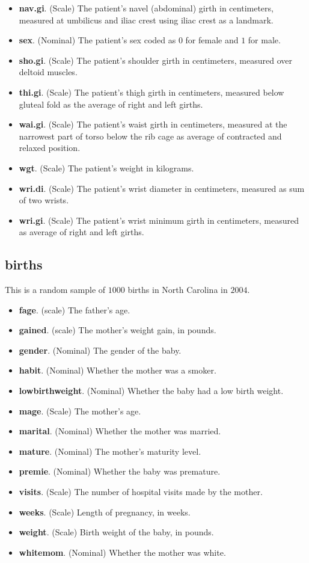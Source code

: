 \begin{itemize}
  \item \textbf{nav.gi}. (Scale) The patient's navel (abdominal) girth in centimeters, measured at umbilicus and iliac crest using iliac crest as a landmark.
  \item \textbf{sex}. (Nominal) The patient's sex coded as $ 0 $ for female and $ 1 $ for male.
  \item \textbf{sho.gi}. (Scale) The patient's shoulder girth in centimeters, measured over deltoid muscles.
  \item \textbf{thi.gi}. (Scale) The patient's thigh girth in centimeters, measured below gluteal fold as the average of right and left girths.
  \item \textbf{wai.gi}. (Scale) The patient's waist girth in centimeters, measured at the narrowest part of torso below the rib cage as average of contracted and relaxed position.  
  \item \textbf{wgt}. (Scale) The patient's weight in kilograms.
  \item \textbf{wri.di}. (Scale) The patient's wrist diameter in centimeters, measured as sum of two wrists.
  \item \textbf{wri.gi}. (Scale) The patient's wrist minimum girth in centimeters, measured as average of right and left girths.  
\end{itemize}

\subsection{births}

This is a random sample of $ 1000 $ births in North Carolina in $ 2004 $.

\begin{itemize}
  \item \textbf{fage}. (scale) The father's age.
  \item \textbf{gained}. (scale) The mother's weight gain, in pounds.
  \item \textbf{gender}. (Nominal) The gender of the baby.
  \item \textbf{habit}. (Nominal) Whether the mother was a smoker.
  \item \textbf{lowbirthweight}. (Nominal) Whether the baby had a low birth weight.
  \item \textbf{mage}. (Scale) The mother's age.
  \item \textbf{marital}. (Nominal) Whether the mother was married.
  \item \textbf{mature}. (Nominal) The mother's maturity level.
  \item \textbf{premie}. (Nominal) Whether the baby was premature.
  \item \textbf{visits}. (Scale) The number of hospital visits made by the mother.
  \item \textbf{weeks}. (Scale) Length of pregnancy, in weeks.
  \item \textbf{weight}. (Scale) Birth weight of the baby, in pounds.
  \item \textbf{whitemom}. (Nominal) Whether the mother was white.
\end{itemize}

